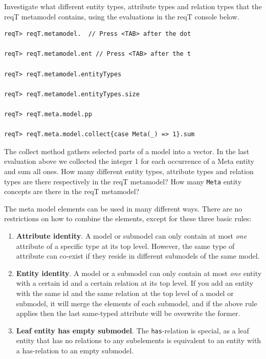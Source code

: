 \documentclass[11pt]{article}
\begin{document}
Investigate what different entity types, attribute types and relation types that the reqT metamodel contains, using the evaluations in the reqT console below. 

\begin{framed}
{\footnotesize\begin{verbatim}
reqT> reqT.metamodel.  // Press <TAB> after the dot

reqT> reqT.metamodel.ent // Press <TAB> after the t

reqT> reqT.metamodel.entityTypes

reqT> reqT.metamodel.entityTypes.size

reqT> reqT.meta.model.pp

reqT> reqT.meta.model.collect{case Meta(_) => 1}.sum
\end{verbatim}}
\noindent The collect method gathers selected parts of a model into a vector. In the last evaluation above we collected the integer 1 for each occurrence of a Meta entity and sum all ones.
\newline\newline 
\noindent
How many different entity types, attribute types and relation types are there respectively in the reqT metamodel? 
\newline
\newline \underline{\hspace{10cm}}
\newline\newline
How many \verb+Meta+ entity concepts are there in the reqT metamodel? 
\newline
\newline \underline{\hspace{10cm}}
\end{framed}

The meta model elements can be used in many different ways. There are no restrictions on how to combine the elements, except for these three basic rules:
\begin{enumerate}
\item {\bf Attribute identity}. A model or submodel can only contain at most {\it one} attribute of a specific type at its top level. However, the same type of attribute can co-exist if they reside in different submodels of the same model. 
\item {\bf Entity identity}. A model or a submodel can only contain at most {\it one} entity with a certain id and a certain relation at its top level. If you add an entity with the same id and the same relation at the top level of a model or submodel, it will merge the elements of each submodel, and if the above rule applies then the last same-typed attribute will be overwrite the former. 
\item {\bf Leaf entity has empty submodel}. The \verb+has+-relation is special, as a leaf entity that has no relations to any subelements is equivalent to an entity with a has-relation to an empty submodel. 
\end{enumerate}
\end{document}
